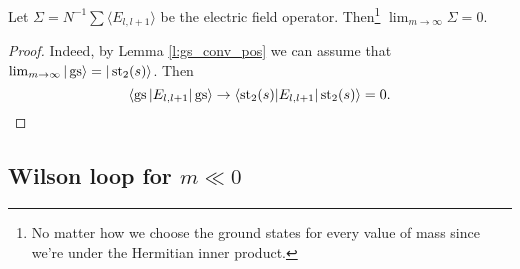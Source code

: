 \begin{proposition}
Let $\Sigma = N^{-1}\sum \langle E_{l,l+1} \rangle$ be the electric field operator. Then\footnote{No matter how we choose the ground states for every value of mass since we're under the Hermitian inner product.} $\lim_{m \rightarrow \infty} \Sigma = 0$.
\end{proposition}
\begin{proof}
Indeed, by Lemma \ref{l:gs_conv_pos} we can assume that $\lim_{m \rightarrow \infty} |\operatorname{gs}\rangle = |\operatorname{st}_2(s)\rangle$. Then 
\[
\langle \operatorname{gs} | E_{l,l+1} | \operatorname{gs} \rangle \rightarrow \langle \operatorname{st}_2(s) | E_{l,l+1}|\operatorname{st}_2(s)\rangle = 0.\qedhere
\]
\end{proof}

\subsection{Wilson loop for $m \ll 0$}
